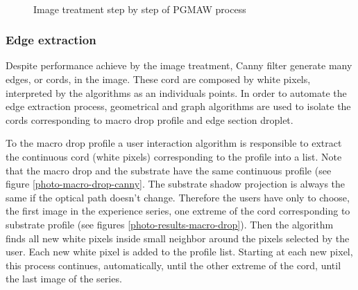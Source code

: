 \documentclass[12pt]{iopart}
\begin{document}
\begin{figure}[h!]
\begin{center}
\\
\end{center}
\caption{{\small Image treatment step by step of PGMAW process}}
\label{photo-macro-drop}
\end{figure}


\subsubsection{Edge extraction}
\label{edge_extraction}
Despite performance achieve by the image treatment, Canny filter
 generate many edges, or cords, in the image. These cord are composed
 by white pixels, interpreted by the algorithms as an individuals points.
 In order to automate the edge extraction process, geometrical and
 graph algorithms are used  to isolate the cords corresponding to
 macro drop profile and edge section droplet.

To the macro drop profile a user interaction algorithm is responsible
 to extract the continuous cord (white pixels) corresponding
 to the profile into a list. Note  that the macro drop and 
the substrate have the same continuous profile (see figure \ref{photo-macro-drop-canny}.
 The substrate shadow projection is always the same if the optical
 path doesn't change. Therefore the users have only to choose, the
 first image in the experience series, one extreme  of the cord 
corresponding to substrate profile (see figures \ref{photo-results-macro-drop}).
 Then the algorithm finds all new white pixels inside small neighbor around
 the pixels selected by the user. Each new white pixel  is added to the
 profile list. Starting at each new pixel, this process continues,
 automatically, until the other extreme of the cord, until the last
 image of the series.
 
\end{document}
